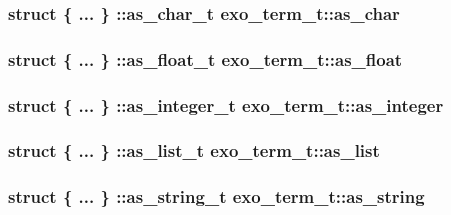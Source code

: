 \subsubsection[{as\_\-char}]{\setlength{\rightskip}{0pt plus 5cm}struct \{ ... \} ::as\_\-char\_\-t  {\bf exo\_\-term\_\-t::as\_\-char}}\label{structexo__term__t_9e4595e158cccba56869f6bc637424a7}


\subsubsection[{as\_\-float}]{\setlength{\rightskip}{0pt plus 5cm}struct \{ ... \} ::as\_\-float\_\-t  {\bf exo\_\-term\_\-t::as\_\-float}}\label{structexo__term__t_bd37ca481ebaf538035ba22a029b3ab5}


\subsubsection[{as\_\-integer}]{\setlength{\rightskip}{0pt plus 5cm}struct \{ ... \} ::as\_\-integer\_\-t  {\bf exo\_\-term\_\-t::as\_\-integer}}\label{structexo__term__t_278055e68572fe16a904735a188c96e7}


\subsubsection[{as\_\-list}]{\setlength{\rightskip}{0pt plus 5cm}struct \{ ... \} ::as\_\-list\_\-t  {\bf exo\_\-term\_\-t::as\_\-list}}\label{structexo__term__t_6db597bcf1578968e5c5495d50bf5b85}


\subsubsection[{as\_\-string}]{\setlength{\rightskip}{0pt plus 5cm}struct \{ ... \} ::as\_\-string\_\-t  {\bf exo\_\-term\_\-t::as\_\-string}}\label{structexo__term__t_5298bd98e525e5f949c0bce4ccc97743}


